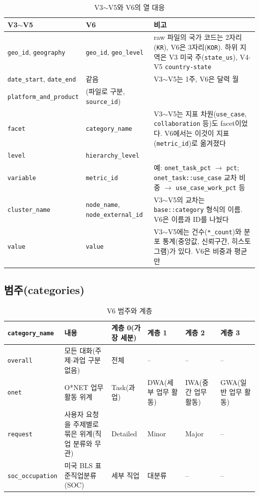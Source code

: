 \documentclass[11pt]{article}
\begin{document}
\begin{longtable}{L{4.2cm}L{4.2cm}L{8.2cm}}
\caption{V3$\sim$V5와 V6의 열 대응}\label{tab:schemaold}\\
\toprule
V3$\sim$V5 & V6 & 비고 \\
\midrule
\endfirsthead
\texttt{geo\_id}, \texttt{geography} & \texttt{geo\_id}, \texttt{geo\_level} & raw 파일의 국가 코드는 2자리(\texttt{KR}), V6은 3자리(\texttt{KOR}). 하위 지역은 V3 미국 주(\texttt{state\_us}), V4$\cdot$V5 \texttt{country-state} \\
\texttt{date\_start}, \texttt{date\_end} & 같음 & V3$\sim$V5는 1주, V6은 달력 월 \\
\texttt{platform\_and\_product} & (파일로 구분, \texttt{source\_id}) & \\
\texttt{facet} & \texttt{category\_name} & V3$\sim$V5는 지표 차원(\texttt{use\_case}, \texttt{collaboration} 등)도 facet이었다. V6에서는 이것이 지표(\texttt{metric\_id})로 옮겨졌다 \\
\texttt{level} & \texttt{hierarchy\_level} & \\
\texttt{variable} & \texttt{metric\_id} & 예: \texttt{onet\_task\_pct} $\to$ \texttt{pct}; \texttt{onet\_task::use\_case} 교차 비중 $\to$ \texttt{use\_case\_work\_pct} 등 \\
\texttt{cluster\_name} & \texttt{node\_name}, \texttt{node\_external\_id} & V3$\sim$V5의 교차는 \texttt{base::category} 형식의 이름. V6은 이름과 ID를 나눴다 \\
\texttt{value} & \texttt{value} & V3$\sim$V5에는 건수(\texttt{*\_count})와 분포 통계(중앙값, 신뢰구간, 히스토그램)가 있다. V6은 비중과 평균만 \\
\bottomrule
\end{longtable}

\subsection{범주(categories)}

\begin{longtable}{L{2.6cm}L{5.0cm}L{2.2cm}L{2.2cm}L{2.2cm}L{2.2cm}}
\caption{V6 범주와 계층}\label{tab:cat}\\
\toprule
\texttt{category\_name} & 내용 & 계층 0(가장 세분) & 계층 1 & 계층 2 & 계층 3 \\
\midrule
\endfirsthead
\texttt{overall} & 모든 대화(주제$\cdot$과업 구분 없음) & 전체 & -- & -- & -- \\
\texttt{onet} & O*NET 업무 활동 위계 & Task(과업) & DWA(세부 업무 활동) & IWA(중간 업무 활동) & GWA(일반 업무 활동) \\
\texttt{request} & 사용자 요청을 주제별로 묶은 위계(직업 분류와 무관) & Detailed & Minor & Major & -- \\
\texttt{soc\_occupation} & 미국 BLS 표준직업분류(SOC) & 세부 직업 & 대분류 & -- & -- \\
\bottomrule
\end{longtable}
\end{document}
